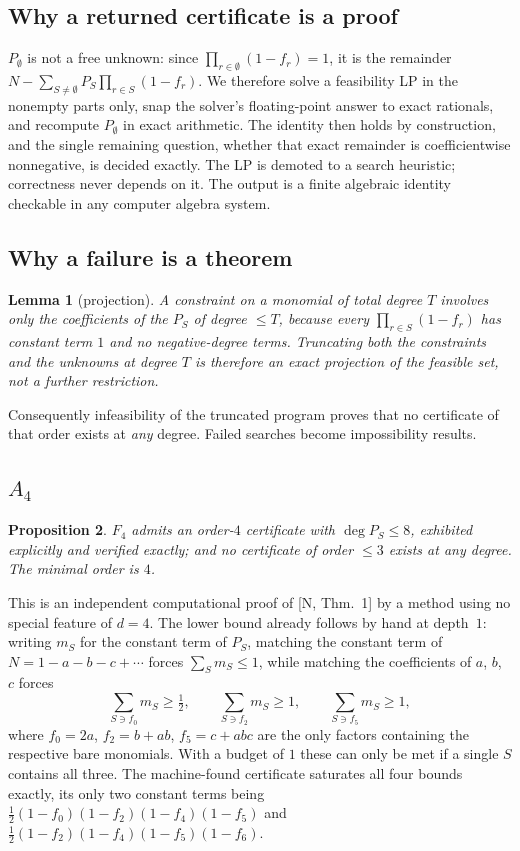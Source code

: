 \documentclass[11pt,a4paper]{article}
\theoremstyle{plain}
\newtheorem{proposition}{Proposition}
\newtheorem{lemma}[proposition]{Lemma}
\theoremstyle{definition}
\theoremstyle{remark}
\begin{document}
\subsection{Why a returned certificate is a proof}

$P_\emptyset$ is not a free unknown: since $\prod_{r \in \emptyset}(1 - f_r) = 1$, it is the
remainder $N - \sum_{S \ne \emptyset} P_S \prod_{r \in S}(1 - f_r)$. We therefore solve a
feasibility LP in the nonempty parts only, snap the solver's floating-point answer to exact
rationals, and recompute $P_\emptyset$ in exact arithmetic. The identity then holds by
construction, and the single remaining question, whether that exact remainder is coefficientwise
nonnegative, is decided exactly. The LP is demoted to a search heuristic; correctness never
depends on it. The output is a finite algebraic identity checkable in any computer algebra
system.

\subsection{Why a failure is a theorem}

\begin{lemma}[projection]
A constraint on a monomial of total degree $T$ involves only the coefficients of the $P_S$ of
degree $\le T$, because every $\prod_{r \in S}(1 - f_r)$ has constant term $1$ and no
negative-degree terms. Truncating both the constraints and the unknowns at degree $T$ is
therefore an exact \emph{projection} of the feasible set, not a further restriction.
\end{lemma}

Consequently infeasibility of the truncated program proves that no certificate of that order
exists at \emph{any} degree. Failed searches become impossibility results.

\subsection{\texorpdfstring{$A_4$}{A\_4}}

\begin{proposition}
$F_4$ admits an order-$4$ certificate with $\deg P_S \le 8$, exhibited explicitly and verified
exactly; and no certificate of order $\le 3$ exists at any degree. The minimal order is $4$.
\end{proposition}

This is an independent computational proof of [N, Thm.~1] by a method using no special feature
of $d = 4$. The lower bound already follows by hand at depth~$1$: writing $m_S$ for the constant
term of $P_S$, matching the constant term of $N = 1 - a - b - c + \cdots$ forces
$\sum_S m_S \le 1$, while matching the coefficients of $a$, $b$, $c$ forces
\[
  \sum_{S \ni f_0} m_S \ge \tfrac12, \qquad
  \sum_{S \ni f_2} m_S \ge 1, \qquad
  \sum_{S \ni f_5} m_S \ge 1,
\]
where $f_0 = 2a$, $f_2 = b + ab$, $f_5 = c + abc$ are the only factors containing the respective
bare monomials. With a budget of $1$ these can only be met if a single $S$ contains all three.
The machine-found certificate saturates all four bounds exactly, its only two constant terms
being $\tfrac12(1-f_0)(1-f_2)(1-f_4)(1-f_5)$ and $\tfrac12(1-f_2)(1-f_4)(1-f_5)(1-f_6)$.
\end{document}
